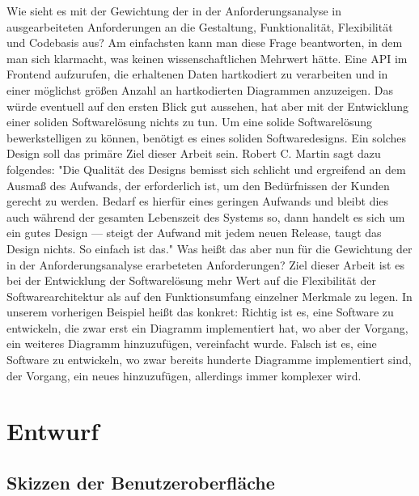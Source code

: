 Wie sieht es mit der Gewichtung der in der Anforderungsanalyse in 
ausgearbeiteten Anforderungen an die Gestaltung, Funktionalität, Flexibilität und Codebasis aus?
Am einfachsten kann man diese Frage beantworten, in dem man sich klarmacht, was keinen wissenschaftlichen
Mehrwert hätte. Eine API im Frontend aufzurufen, die erhaltenen Daten hartkodiert zu verarbeiten und
in einer möglichst größen Anzahl an hartkodierten Diagrammen anzuzeigen. Das würde eventuell auf den
ersten Blick gut aussehen, hat aber mit der Entwicklung einer soliden Softwarelösung nichts zu tun.
Um eine solide Softwarelösung bewerkstelligen zu können, benötigt es eines soliden Softwaredesigns.
Ein solches Design soll das primäre Ziel dieser Arbeit sein. Robert C. Martin sagt dazu folgendes:
"Die Qualität des Designs bemisst sich schlicht und ergreifend an dem Ausmaß des Aufwands, der
erforderlich ist, um den Bedürfnissen der Kunden gerecht zu werden. Bedarf es hierfür eines
geringen Aufwands und bleibt dies auch während der gesamten Lebenszeit des Systems so,
dann handelt es sich um ein gutes Design — steigt der Aufwand mit jedem neuen Release,
taugt das Design nichts. So einfach ist das."\cite[S. 30]{RobertC.Martin2018} Was heißt
das aber nun für die Gewichtung der in der Anforderungsanalyse erarbeteten Anforderungen?
Ziel dieser Arbeit ist es bei der Entwicklung der Softwarelösung mehr Wert auf die Flexibilität
der Softwarearchitektur als auf den Funktionsumfang einzelner Merkmale zu legen. In unserem
vorherigen Beispiel heißt das konkret: Richtig ist es, eine Software zu entwickeln, die zwar erst ein Diagramm
implementiert hat, wo aber der Vorgang, ein weiteres Diagramm hinzuzufügen, vereinfacht wurde.
Falsch ist es, eine Software zu entwickeln, wo zwar bereits hunderte Diagramme implementiert sind,
der Vorgang, ein neues hinzuzufügen, allerdings immer komplexer wird.

\section{Entwurf}
\label{sec:entwurf}

\subsection{Skizzen der Benutzeroberfläche}
\label{subsec:skizzenderbenutzeroberflaeche}

